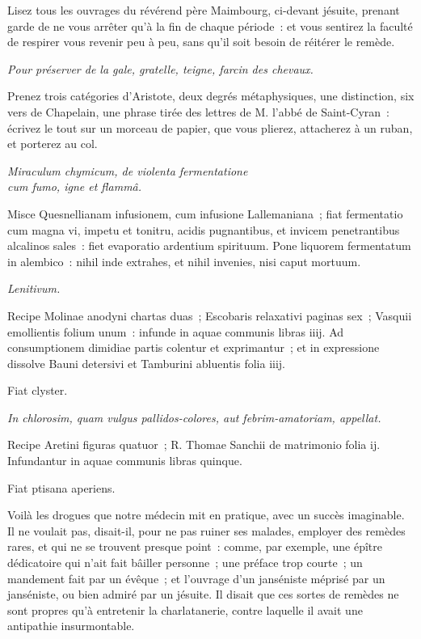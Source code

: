 \documentclass[french,twoside]{book} %
\begin{document}
Lisez tous les ouvrages du révérend père Maimbourg, ci-devant jésuite, prenant garde de ne vous arrêter qu’à la fin de chaque période : et vous sentirez la faculté de respirer vous revenir peu à peu, sans qu’il soit besoin de réitérer le remède.\par
 {\itshape Pour préserver de la gale, gratelle, teigne, farcin des chevaux.} \par
Prenez trois catégories d’Aristote, deux degrés métaphysiques, une distinction, six vers de Chapelain, une phrase tirée des lettres de M. l’abbé de Saint-Cyran : écrivez le tout sur un morceau de papier, que vous plierez, attacherez à un ruban, et porterez au col.\par
 {\itshape Miraculum chymicum, de violenta fermentatione \\
cum fumo, igne et flammâ.} \par
Misce Quesnellianam infusionem, cum infusione Lallemaniana ; fiat fermentatio cum magna vi, impetu et tonitru, acidis pugnantibus, et invicem penetrantibus alcalinos sales : fiet evaporatio ardentium spirituum. Pone liquorem fermentatum in alembico : nihil inde extrahes, et nihil invenies, nisi caput mortuum.\par
 {\itshape Lenitivum.} \par
Recipe Molinae anodyni chartas duas ; Escobaris relaxativi paginas sex ; Vasquii emollientis folium unum : infunde in aquae communis libras iiij. Ad consumptionem dimidiae partis colentur et exprimantur ; et in expressione dissolve Bauni detersivi et Tamburini abluentis folia iiij.\par
Fiat clyster.\par
 {\itshape In chlorosim, quam vulgus pallidos-colores, aut febrim-amatoriam, appellat.} \par
Recipe Aretini figuras quatuor ; R. Thomae Sanchii de matrimonio folia ij. Infundantur in aquae communis libras quinque.\par
Fiat ptisana aperiens.\par
Voilà les drogues que notre médecin mit en pratique, avec un succès imaginable. Il ne voulait pas, disait-il, pour ne pas ruiner ses malades, employer des remèdes rares, et qui ne se trouvent presque point : comme, par exemple, une épître dédicatoire qui n’ait fait bâiller personne ; une préface trop courte ; un mandement fait par un évêque ; et l’ouvrage d’un janséniste méprisé par un janséniste, ou bien admiré par un jésuite. Il disait que ces sortes de remèdes ne sont propres qu’à entretenir la charlatanerie, contre laquelle il avait une antipathie insurmontable.
\end{document}
